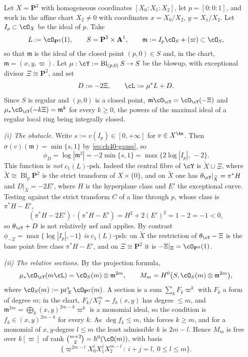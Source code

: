 \begin{example}
\label{ex:ch40-p2-obstacle}
Let $X=\mathbf P^2$ with homogeneous coordinates $[X_0:X_1:X_2]$, let
$p=[0:0:1]$, and work in the affine chart $X_2\ne0$ with coordinates
$x=X_0/X_2$, $y=X_1/X_2$.  Let $I_p\subset\cO_X$ be the ideal of
$p$.  Take
\[
 L:=\cO_{\mathbf P^2}(1),
 \qquad
 S=\mathbf P^2\times\mathbf A^1,
 \qquad
 \mathfrak m:=I_p\cO_S+(\varpi)\subset\cO_S,
\]
so that $\mathfrak m$ is the ideal of the closed point $(p,0)\in S$ and,
in the chart, $\mathfrak m=(x,y,\varpi)$.  Let
$\mu:\cY:=\operatorname{Bl}_{(p,0)}S\to S$ be the blowup, with exceptional
divisor $\Xi\cong\mathbf P^2$, and set
\[
 D:=-2\Xi,\qquad \cL:=\mu^*L+D .
\]
Since $S$ is regular and $(p,0)$ is a closed point,
$\mathfrak m\cO_{\cY}=\cO_{\cY}(-\Xi)$ and
$\mu_*\cO_{\cY}(-k\Xi)=\mathfrak m^k$ for every $k\ge0$, the powers of
the maximal ideal of a regular local ring being integrally closed.

\emph{(i) The obstacle.}  Write $s:=v(I_p)\in[0,+\infty]$ for
$v\in X^{\An}$.  Then $\sigma(v)(\mathfrak m)=\min\{s,1\}$ by
\eqref{eq:ch40-gauss}, so
\[
 \phi_D=\log|\mathfrak m^2|=-2\min\{s,1\}
 =\max\{2\log|I_p|,\,-2\}.
\]
This function is \emph{not} $c_1(L)$-psh.  Indeed the central fibre of
$\cY$ is $\widetilde X\cup\Xi$, where
$\widetilde X\cong\operatorname{Bl}_p\mathbf P^2$ is the strict transform
of $X\times\{0\}$, and on $\widetilde X$ one has
$\theta_{\cY}|_{\widetilde X}=\pi^*H$ and
$D|_{\widetilde X}=-2E'$, where $H$ is the hyperplane class and $E'$
the exceptional curve.  Testing against the strict transform $C$ of a line
through $p$, whose class is $\pi^*H-E'$,
\[
 (\pi^*H-2E')\cdot(\pi^*H-E')=H^2+2(E')^2=1-2=-1<0,
\]
so $\theta_{\cY}+D$ is not relatively nef and
 applies.  By contrast
$\phi_{-\Xi}=\max\{\log|I_p|,-1\}$ \emph{is} $c_1(L)$-psh: on
$\widetilde X$ the restriction of $\theta_{\cY}-\Xi$ is the base point
free class $\pi^*H-E'$, and on $\Xi\cong\mathbf P^2$ it is
$-\Xi|_{\Xi}=\cO_{\mathbf P^2}(1)$.

\emph{(ii) The relative sections.}  By the projection formula,
\[
 \mu_*\cO_{\cY}(m\cL)
 =\cO_S(m)\otimes\mathfrak m^{2m},
 \qquad
 M_m=H^0\bigl(S,\cO_S(m)\otimes\mathfrak m^{2m}\bigr),
\]
where $\cO_S(m):=\operatorname{pr}_X^*\cO_{\mathbf P^2}(m)$.  A section is
a sum $\sum_kF_k\varpi^k$ with $F_k$ a form of degree $m$; in the
chart, $F_k/X_2^m=f_k(x,y)$ has degree $\le m$, and
$\mathfrak m^{2m}=\bigoplus_k(x,y)^{2m-k}\varpi^k$ is a monomial ideal, so
the condition is $f_k\in(x,y)^{2m-k}$ for every $k$.  As
$\deg f_k\le m$, this forces $k\ge m$, and for a monomial of
$x,y$-degree $l\le m$ the least admissible $k$ is $2m-l$.  Hence
$M_m$ is free over $k[\varpi]$ of rank $\binom{m+2}{2}=h^0(\cO(m))$,
with basis
\[
 \bigl\{\varpi^{2m-l}X_0^iX_1^jX_2^{m-l}\ :\
 i+j=l,\ 0\le l\le m\bigr\}.
\]


\end{example}
